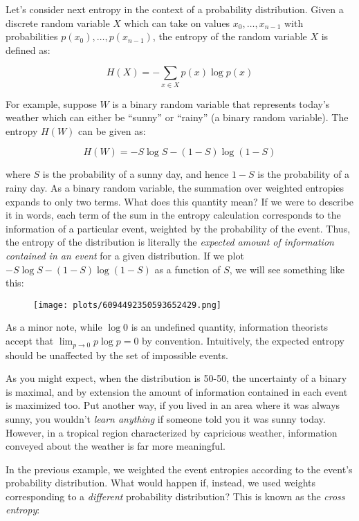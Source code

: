 \documentclass[
]{article}
\begin{document}
Let's consider next entropy in the context of a probability
distribution. Given a discrete random variable \(X\) which can take on
values \(x_0, \dots, x_{n-1}\) with probabilities
\(p(x_0), \dots, p(x_{n-1})\), the entropy of the random variable \(X\)
is defined as:

\[H(X) = -\sum_{x \in X} p(x) \log p(x)\]

For example, suppose \(W\) is a binary random variable that represents
today's weather which can either be ``sunny'' or ``rainy'' (a binary
random variable). The entropy \(H(W)\) can be given as:

\[H(W) = -S\log S - (1 - S) \log (1 - S)\]

where \(S\) is the probability of a sunny day, and hence \(1 - S\) is
the probability of a rainy day. As a binary random variable, the
summation over weighted entropies expands to only two terms. What does
this quantity mean? If we were to describe it in words, each term of the
sum in the entropy calculation corresponds to the information of a
particular event, weighted by the probability of the event. Thus, the
entropy of the distribution is literally the \emph{expected amount of
information contained in an event} for a given distribution. If we plot
\(-S\log S - (1 - S) \log(1 - S)\) as a function of \(S\), we will see
something like this:

\begin{figure}
\centering
\texttt{[image: plots/6094492350593652429.png]}
\caption{}
\end{figure}

As a minor note, while \(\log 0\) is an undefined quantity, information
theorists accept that \(\lim_{p\rightarrow 0} p\log p = 0\) by
convention. Intuitively, the expected entropy should be unaffected by
the set of impossible events.

As you might expect, when the distribution is 50-50, the uncertainty of
a binary is maximal, and by extension the amount of information
contained in each event is maximized too. Put another way, if you lived
in an area where it was always sunny, you wouldn't \emph{learn anything}
if someone told you it was sunny today. However, in a tropical region
characterized by capricious weather, information conveyed about the
weather is far more meaningful.

In the previous example, we weighted the event entropies according to
the event's probability distribution. What would happen if, instead, we
used weights corresponding to a \emph{different} probability
distribution? This is known as the \emph{cross entropy}:
\end{document}
